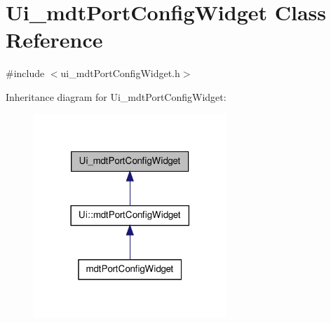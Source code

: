 \hypertarget{class_ui__mdt_port_config_widget}{\section{Ui\-\_\-mdt\-Port\-Config\-Widget Class Reference}
\label{class_ui__mdt_port_config_widget}
}


{\ttfamily \#include $<$ui\-\_\-mdt\-Port\-Config\-Widget.\-h$>$}



Inheritance diagram for Ui\-\_\-mdt\-Port\-Config\-Widget\-:\nopagebreak
\begin{figure}[H]
\begin{center}
\leavevmode
\includegraphics[width=206pt]{class_ui__mdt_port_config_widget__inherit__graph}
\end{center}
\end{figure}


